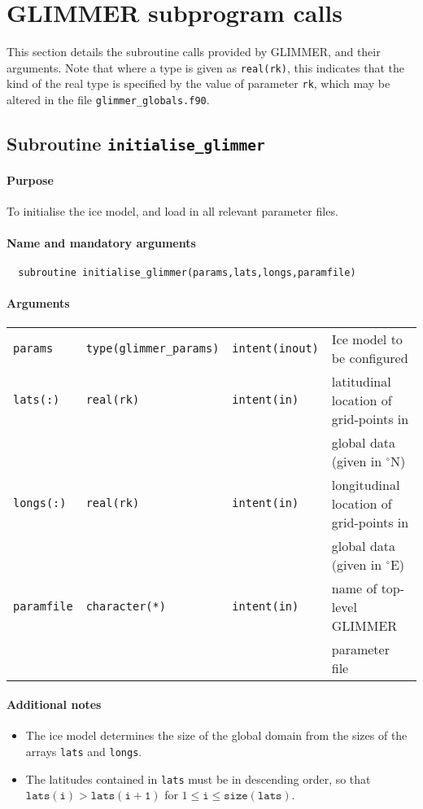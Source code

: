 \section{GLIMMER subprogram calls}
%
This section details the subroutine calls provided by GLIMMER, and their
arguments. Note that where a type is given as \texttt{real(rk)}, this
indicates that the kind of the real type is specified by the value of
parameter \texttt{rk}, which may be altered in the file \texttt{glimmer\_globals.f90}.
%
\subsection{Subroutine \texttt{initialise\_glimmer}}
%
\paragraph{Purpose} To initialise the ice model, and load in all relevant parameter files.
%
\paragraph{Name and mandatory arguments}
%
\begin{verbatim}
  subroutine initialise_glimmer(params,lats,longs,paramfile)
\end{verbatim}
%
\paragraph{Arguments}
%
\begin{center}
\begin{tabular}{llll}
\texttt{params}    & \texttt{type(glimmer\_params)} & \texttt{intent(inout)} &
Ice model to be configured \\
\texttt{lats(:)}   & \texttt{real(rk)} & \texttt{intent(in)} & latitudinal location of grid-points in \\
 & & & global data (given in $^{\circ}\mathrm{N}$)\\
\texttt{longs(:)}  & \texttt{real(rk)} & \texttt{intent(in)} & longitudinal location of grid-points in \\
 & & & global data (given in $^{\circ}\mathrm{E}$)\\
\texttt{paramfile} & \texttt{character(*)} & \texttt{intent(in)} & name of
top-level GLIMMER \\
 & & & parameter file \\
\end{tabular}
\end{center}
%
\paragraph{Additional notes}
%
\begin{itemize}
\item The ice model determines the size of the global domain from the sizes of
  the arrays \texttt{lats} and \texttt{longs}.
\item The latitudes contained in \texttt{lats} must be in descending order, so
  that $\mathtt{lats(i)}>\mathtt{lats(i+1)}$ for $1\leq \mathtt{i} \leq
  \mathtt{size(lats)}$.
\end{itemize}
%
